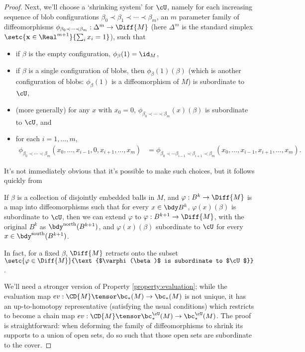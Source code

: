 \begin{proof}
Next, we'll choose a `shrinking system' for $\cU$, namely for each increasing sequence of blob configurations
$\beta_0 \prec \beta_1 \prec \cdots \prec \beta_m$, an $m$ parameter family of diffeomorphisms
$\phi_{\beta_0 \prec \cdots \prec \beta_m} : \Delta^m \to \Diff{M}$ (here $\Delta^m$ is the standard simplex $\setc{\mathbf{x} \in \Real^{m+1}}{\sum_i x_i = 1}$), such that
\begin{itemize}
\item if $\beta$ is the empty configuration, $\phi_{\beta}(1) = \id_M$,
\item if $\beta$ is a single configuration of blobs, then $\phi_{\beta}(1)(\beta)$ (which is another configuration of blobs: $\phi_{\beta}(1)$ is a diffeomorphism of $M$) is subordinate to $\cU$,
\item (more generally) for any $x$ with $x_0 = 0$, $\phi_{\beta_0 \prec \cdots \prec \beta_m}(x)(\beta)$ is subordinate to $\cU$, and
\item for each $i = 1, \ldots, m$,
\begin{align*}
\phi_{\beta_0 \prec \cdots \prec \beta_m}(x_0, \ldots, x_{i-1},0,x_{i+1},\ldots,x_m) & = \phi_{\beta_0 \prec \cdots \beta_{i-1} \prec \beta_{i+1} \prec \beta_m}(x_0,\ldots, x_{i-1},x_{i+1},\ldots,x_m).
\end{align*}
\end{itemize}
It's not immediately obvious that it's possible to make such choices, but it follows quickly from
\begin{claim}
If $\beta$ is a collection of disjointly embedded balls in $M$, and $\varphi: B^k \to \Diff{M}$ is a map into diffeomorphisms such that for every $x\in \bdy B^k$, $\varphi(x)(\beta)$ is subordinate to $\cU$, then we can extend $\varphi$ to $\varphi:B^{k+1} \to \Diff{M}$, with the original $B^k$ as $\bdy^{\text{north}}(B^{k+1})$, and $\varphi(x)(\beta)$ subordinate to $\cU$ for every $x \in \bdy^{\text{south}}(B^{k+1})$.

In fact, for a fixed $\beta$, $\Diff{M}$ retracts onto the subset $\setc{\varphi \in \Diff{M}}{\text{$\varphi(\beta)$ is subordinate to $\cU$}}$.
\end{claim}

We'll need a stronger version of Property \ref{property:evaluation}; while the evaluation map $ev: \CD{M} \tensor \bc_*(M) \to \bc_*(M)$ is not unique, it has an up-to-homotopy representative (satisfying the usual conditions) which restricts to become a chain map $ev: \CD{M} \tensor \bc^{\cU}_*(M) \to \bc^{\cU}_*(M)$. The proof is straightforward: when deforming the family of diffeomorphisms to shrink its supports to a union of open sets, do so such that those open sets are subordinate to the cover.


\end{proof}
